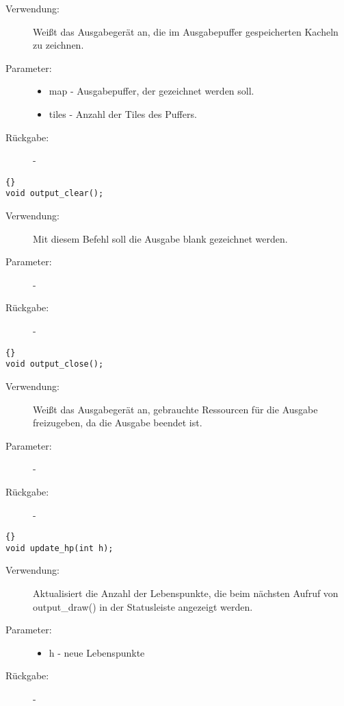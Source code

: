 \documentclass[11pt,a4paper,notitlepage]{report}
\begin{document}
	\begin{description}
		\item[Verwendung:] Weißt das Ausgabegerät an, die im Ausgabepuffer gespeicherten Kacheln zu zeichnen.
		\item[Parameter:] \hfill
		\begin{itemize}
			\item map - Ausgabepuffer, der gezeichnet werden soll.
			\item tiles - Anzahl der Tiles des Puffers.
		\end{itemize}
		\item[Rückgabe:] -
	\end{description}
	
		\begin{lstlisting}[caption=output\_clear]{}
void output_clear();
		\end{lstlisting}
		
	\begin{description}
		\item[Verwendung:] Mit diesem Befehl soll die Ausgabe blank gezeichnet werden.
		\item[Parameter:] -
		\item[Rückgabe:] -
	\end{description}
	
		\begin{lstlisting}[caption=output\_close]{}
void output_close();
		\end{lstlisting}
		
	\begin{description}
		\item[Verwendung:] Weißt das Ausgabegerät an, gebrauchte Ressourcen für die Ausgabe freizugeben, da die Ausgabe beendet ist.
		\item[Parameter:] -
		\item[Rückgabe:] -
	\end{description}

		\begin{lstlisting}[caption=update\_hp]{}
void update_hp(int h);
		\end{lstlisting}

	\begin{description}
		\item[Verwendung:] Aktualisiert die Anzahl der Lebenspunkte, die beim nächsten Aufruf von output\_draw() in der Statusleiste angezeigt werden.
		\item[Parameter:] \hfill
		\begin{itemize}
			\item h - neue Lebenspunkte
		\end{itemize}
		\item[Rückgabe:] -
	\end{description}
\end{document}
